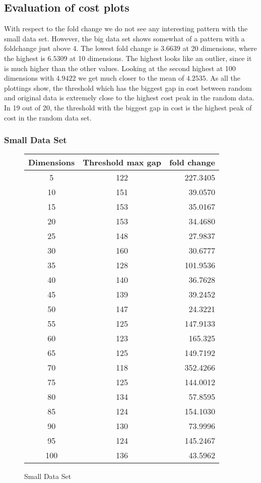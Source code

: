 \documentclass[a4paper,10pt]{article}
\begin{document}
\subsection{Evaluation of cost plots}
With respect to the fold change we do not see any interesting pattern with the small data set. However, the big data set shows somewhat of a pattern with a foldchange just above 4. The lowest fold change is $3.6639$ at 20 dimensions, where the highest is $6.5309$ at 10 dimensions. The highest looks like an outlier, since it is much higher than the other values. Looking at the second highest at 100 dimensions with $4.9422$ we get much closer to the mean of $4.2535$.
As all the plottings show, the threshold which has the biggest gap in cost between random and original data is extremely close to the highest cost peak in the random data. In 19 out of 20, the threshold with the biggest gap in cost is the highest peak of cost in the random data set.

\subsubsection{Small Data Set}
\begin{figure}[h]
	\centering
	\begin{tabular}{|c|c|r|}
		\hline
		Dimensions & Threshold max gap & fold change \\\hline
		5   & 122 & 227.3405 \\\hline
		10  & 151 & 39.0570 \\\hline
		15  & 153 & 35.0167 \\\hline
		20  & 153 & 34.4680 \\\hline
		25  & 148 & 27.9837 \\\hline
		30  & 160 & 30.6777 \\\hline
		35  & 128 & 101.9536 \\\hline
		40  & 140 & 36.7628 \\\hline
		45  & 139 & 39.2452 \\\hline
		50  & 147 & 24.3221 \\\hline	
		55  & 125 & 147.9133 \\\hline
		60  & 123 & 165.325 \\\hline
		65  & 125 & 149.7192 \\\hline
		70  & 118 & 352.4266 \\\hline
		75  & 125 & 144.0012 \\\hline
		80  & 134 & 57.8595 \\\hline
		85  & 124 & 154.1030 \\\hline
		90  & 130 & 73.9996 \\\hline
		95  & 124 & 145.2467 \\\hline
		100 & 136 & 43.5962 \\\hline
	\end{tabular}
	\caption{Small Data Set}
\end{figure}
\end{document}
